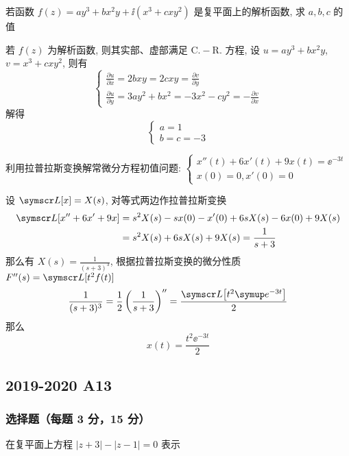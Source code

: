 \begin{ti}[$12$ 分]
	若函数 $f(z)=a y^{3}+b x^{2} y+\ii\left(x^{3}+c x y^{2}\right)$ 是复平面上的解析函数, 求 $a,b,c$ 的值
	\begin{solution}
		若 $f(z)$ 为解析函数, 则其实部、虚部满足 $\mathrm{C}.-\mathrm{R}.$ 方程, 设 $u=ay^3+bx^2y$, $v=x^3+cxy^2$, 则有
		\begin{equation*}
			\begin{cases}
			\frac{\partial u}{\partial x}=2 b x y=2 c x y=\frac{\partial v}{\partial y}\\
			\frac{\partial u}{\partial y}=3 a y^{2}+b x^{2}=-3 x^{2}-c y^{2}=-\frac{\partial v}{\partial x}
			\end{cases}
		\end{equation*}
		解得
		\begin{equation*}
			\begin{cases}
			a=1\\
			b=c=-3
			\end{cases}
		\end{equation*}
	\end{solution}
\end{ti}

\begin{ti}[$10$ 分]
	利用拉普拉斯变换解常微分方程初值问题: $\begin{cases}
		x''(t)+6x'(t)+9x(t)=\ee^{-3t}\\
		x(0)=0, x'(0)=0
	\end{cases}$
	\begin{solution}
		设 $\LL[x]=X(s)$, 对等式两边作拉普拉斯变换
		\begin{align*}
			\LL[x''+6x'+9x]&=s^2X(s)-sx(0)-x'(0)+6sX(s)-6x(0)+9X(s)\\
			&=s^2X(s)+6sX(s)+9X(s)=\frac{1}{s+3}
		\end{align*}
		那么有 $X(s)=\frac{1}{(s+3)^3}$, 根据拉普拉斯变换的微分性质 $F''(s)=\LL[t^2f(t)]$
		\begin{equation*}
			\frac{1}{(s+3)^3}=\frac{1}{2}\left(\frac{1}{s+3} \right)''=\frac{\LL\bigl[t^2\ee^{-3t}\bigr]}{2}
		\end{equation*}
		那么
		\[
			x(t)=\frac{t^2\ee^{-3t}}{2}
		\]
	\end{solution}
\end{ti}

\subsection{2019-2020 A13}
\subsubsection{选择题（每题 3 分，15 分）}
\begin{ti}
	在复平面上方程 $|z + 3| - |z - 1| = 0$ 表示 \kuo
\end{ti}

